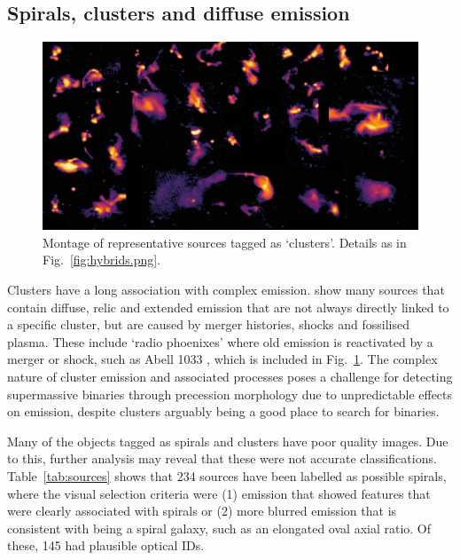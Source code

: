 \documentclass{aa}
\begin{document}
\subsection{Spirals, clusters and diffuse emission}
\begin{figure}
\includegraphics[width=1\linewidth]{Images/galaxies/cluster.png}
\caption{Montage of representative sources tagged as `clusters'. Details as in Fig.\ \ref{fig:hybrids.png}.}
\label{fig:clusters.png}
\end{figure}
Clusters have a long association with complex emission. \cite{vanweeren19} show many sources that contain diffuse, relic and extended emission that are not always directly linked to a specific cluster, but are caused by merger histories, shocks and fossilised plasma. These include `radio phoenixes' where old emission is reactivated by a merger or shock, such as Abell 1033 \citep{degasperin15}, which is included in Fig.~\ref{fig:clusters.png}. The complex nature of cluster emission and associated processes poses a challenge for detecting supermassive binaries through precession morphology due to unpredictable effects on emission, despite clusters arguably being a good place to search for binaries.

Many of the objects tagged as spirals and clusters have poor quality images. Due to this, further analysis may reveal that these were not accurate classifications. Table~\ref{tab:sources} shows that 234 sources have been labelled as possible spirals, where the visual selection criteria were (1) emission that showed features that were clearly associated with spirals or (2) more blurred emission that is consistent with being a spiral galaxy, such as an elongated oval axial ratio. Of these, 145 had plausible optical IDs. 
\end{document}
